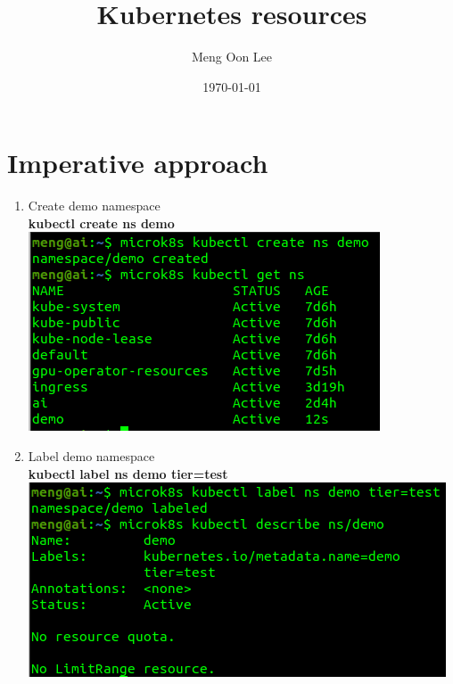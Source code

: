 \documentclass[12pt, times, a4paper]{article}
\begin{document}
\title{Kubernetes resources}
\author{Meng Oon Lee}
\date{\today}

\maketitle

\section{Imperative approach}

\begin{enumerate}
\item Create demo namespace \\
\textbf{kubectl create ns demo} \\
\newline
\includegraphics[width=\textwidth]{fig/ns-demo.png}

\item Label demo namespace \\
\textbf{kubectl label ns demo tier=test} \\
\newline
\includegraphics[width=\textwidth]{fig/demo-tier.png}


\end{enumerate}
\end{document}
